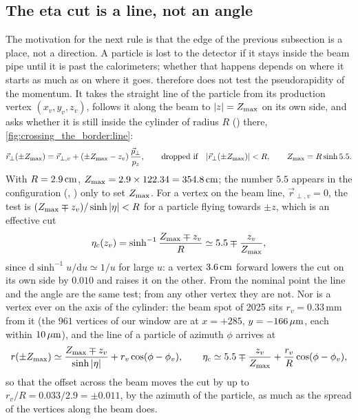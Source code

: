 \subsection{The eta cut is a line, not an angle}
\label{sec:crossing_the_border:line}

The motivation for the next rule is that the edge of the previous
subsection is a place, not a direction. A particle is lost to the
detector if it stays inside the beam pipe until it is past the
calorimeters; whether that happens depends on where it starts as much as
on where it goes.  therefore does not test the
pseudorapidity of the momentum. It takes the straight line of the particle
from its production vertex $(x_v,y_v,z_v)$, follows it along the beam to
$|z|=Z_{\max}$ on its own side, and asks whether it is still inside the
cylinder of radius $R$ () there,
\cref{fig:crossing_the_border:line}:
\begin{equation}
  \vec r_\perp(\pm Z_{\max})=\vec r_{\perp,v}+(\pm Z_{\max}-z_v)\,\frac{\vec p_\perp}{p_z},
  \qquad
  \text{dropped if}\quad |\vec r_\perp(\pm Z_{\max})|<R,
  \qquad Z_{\max}=R\sinh5.5 .
  \label{eq:crossing_the_border:etacut}
\end{equation}
With $R=2.9\,\mathrm{cm}$, $Z_{\max}=2.9\times122.34=354.8\,\mathrm{cm}$; the number $5.5$ appears in
the configuration (, ) only to set $Z_{\max}$. For
a vertex on the beam line, $\vec r_{\perp,v}=0$, the test is
$(Z_{\max}\mp z_v)/\sinh|\eta|<R$ for a particle flying towards $\pm z$, which is an
effective cut
\begin{equation}
  \eta_c(z_v)=\sinh^{-1}\frac{Z_{\max}\mp z_v}{R}\simeq5.5\mp\frac{z_v}{Z_{\max}},
  \label{eq:crossing_the_border:etac}
\end{equation}
since $\mathrm{d}\sinh^{-1}u/\mathrm{d}u\simeq1/u$ for large $u$: a vertex
$3.6\,\mathrm{cm}$ forward lowers the cut on its own side by $0.010$ and raises it on
the other. From the nominal point the line and the angle are the same test;
from any other vertex they are not. Nor is a vertex ever on the axis of the
cylinder: the beam spot of 2025 sits $r_v=0.33$\,mm from it (the $961$
vertices of our window are at $x=+285$, $y=-166\,\mu\mathrm{m}$, each within $10\,\mu\mathrm{m}$),
and the line of a particle of azimuth $\phi$ arrives at
\begin{equation}
  r(\pm Z_{\max})\simeq\frac{Z_{\max}\mp z_v}{\sinh|\eta|}+r_v\cos(\phi-\phi_v),
  \qquad
  \eta_c\simeq5.5\mp\frac{z_v}{Z_{\max}}+\frac{r_v}{R}\cos(\phi-\phi_v),
  \label{eq:crossing_the_border:etac_rv}
\end{equation}
so that the offset across the beam moves the cut by up to
$r_v/R=0.033/2.9=\pm0.011$, by the azimuth of the particle, as much as the
spread of the vertices along the beam does.

